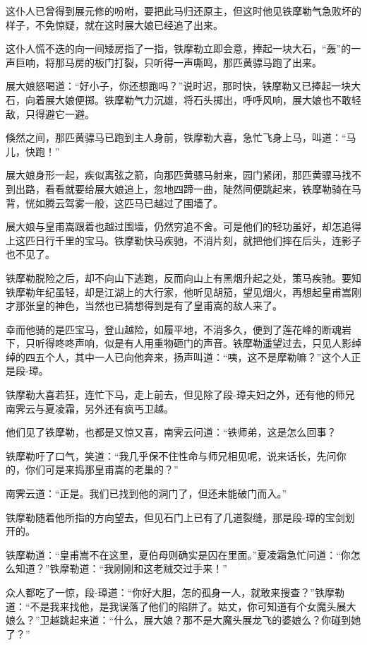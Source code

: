 \documentclass[12pt,oneside]{book}
\begin{document}
这仆人已曾得到展元修的吩咐，要把此马归还原主，但这时他见铁摩勒气急败坏的样子，不免惊疑，就在这时展大娘已经追了出来。

这仆人慌不迭的向一间矮房指了一指，铁摩勒立即会意，捧起一块大石，``轰''的一声巨响，将那马房的板门打裂，只听得一声嘶鸣，那匹黄骠马跑了出来。

展大娘怒喝道：``好小子，你还想跑吗？''说时迟，那时快，铁摩勒又已捧起一块大石，向着展大娘便掷。铁摩勒气力沉雄，将石头掷出，呼呼风响，展大娘也不敢轻敌，只得避它一避。

倏然之间，那匹黄骠马已跑到主人身前，铁摩勒大喜，急忙飞身上马，叫道：``马儿，快跑！''

展大娘身形一起，疾似离弦之箭，向那匹黄骠马射来，园门紧闭，那匹黄骠马找不到出路，看看就要给展大娘追上，忽地四蹄一曲，陡然间便跳起来，铁摩勒骑在马背，恍如腾云驾雾一般，这匹马已越过了围墙了。

展大娘与皇甫嵩跟着也越过围墙，仍然穷追不舍。可是他们的轻功虽好，却怎追得上这匹日行千里的宝马。铁摩勒快马疾驰，不消片刻，就把他们摔在后头，连影子也不见了。

铁摩勒脱险之后，却不向山下逃跑，反而向山上有黑烟升起之处，策马疾驰。要知铁摩勒年纪虽轻，却是江湖上的大行家，他听见胡笳，望见烟火，再想起皇甫嵩刚才那张皇的神色，当然也已猜想得到是有了皇甫嵩的敌人来了。

幸而他骑的是匹宝马，登山越险，如履平地，不消多久，便到了莲花峰的断魂岩下，只听得咚咚声响，似是有人用重物砸门的声音。铁摩勒遥望过去，只见人影绰绰的四五个人，其中一人已向他奔来，扬声叫道：``咦，这不是摩勒嘛？''这个人正是段-璋。

铁摩勒大喜若狂，连忙下马，走上前去，但见除了段-璋夫妇之外，还有他的师兄南霁云与夏凌霜，另外还有疯丐卫越。

他们见了铁摩勒，也都是又惊又喜，南霁云问道：``铁师弟，这是怎么回事？

铁摩勒吁了口气，笑道：``我几乎保不住性命与师兄相见呢，说来话长，先问你的，你们可是来捣那皇甫嵩的老巢的？''

南霁云道：``正是。我们已找到他的洞门了，但还未能破门而入。''

铁摩勒随着他所指的方向望去，但见石门上已有了几道裂缝，那是段-璋的宝剑划开的。

铁摩勒道：``皇甫嵩不在这里，夏伯母则确实是囚在里面。''夏凌霜急忙问道：``你怎么知道？''铁摩勒道：``我刚刚和这老贼交过手来！''

众人都吃了一惊，段-璋道：``你好大胆，怎的孤身一人，就敢来搜查？''铁摩勒道：``不是我来找他，是我误落了他们的陷阱了。姑丈，你可知道有个女魔头展大娘么？''卫越跳起来道：``什么，展大娘？那不是大魔头展龙飞的婆娘么？你碰到她了？''
\end{document}

